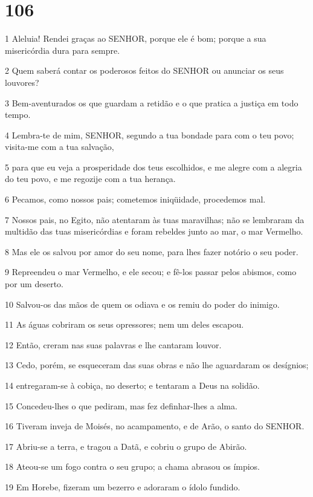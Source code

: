 \chapter{106}

\par 1 Aleluia! Rendei graças ao SENHOR, porque ele é bom; porque a sua misericórdia dura para sempre.
\par 2 Quem saberá contar os poderosos feitos do SENHOR ou anunciar os seus louvores?
\par 3 Bem-aventurados os que guardam a retidão e o que pratica a justiça em todo tempo.
\par 4 Lembra-te de mim, SENHOR, segundo a tua bondade para com o teu povo; visita-me com a tua salvação,
\par 5 para que eu veja a prosperidade dos teus escolhidos, e me alegre com a alegria do teu povo, e me regozije com a tua herança.
\par 6 Pecamos, como nossos pais; cometemos iniqüidade, procedemos mal.
\par 7 Nossos pais, no Egito, não atentaram às tuas maravilhas; não se lembraram da multidão das tuas misericórdias e foram rebeldes junto ao mar, o mar Vermelho.
\par 8 Mas ele os salvou por amor do seu nome, para lhes fazer notório o seu poder.
\par 9 Repreendeu o mar Vermelho, e ele secou; e fê-los passar pelos abismos, como por um deserto.
\par 10 Salvou-os das mãos de quem os odiava e os remiu do poder do inimigo.
\par 11 As águas cobriram os seus opressores; nem um deles escapou.
\par 12 Então, creram nas suas palavras e lhe cantaram louvor.
\par 13 Cedo, porém, se esqueceram das suas obras e não lhe aguardaram os desígnios;
\par 14 entregaram-se à cobiça, no deserto; e tentaram a Deus na solidão.
\par 15 Concedeu-lhes o que pediram, mas fez definhar-lhes a alma.
\par 16 Tiveram inveja de Moisés, no acampamento, e de Arão, o santo do SENHOR.
\par 17 Abriu-se a terra, e tragou a Datã, e cobriu o grupo de Abirão.
\par 18 Ateou-se um fogo contra o seu grupo; a chama abrasou os ímpios.
\par 19 Em Horebe, fizeram um bezerro e adoraram o ídolo fundido.
